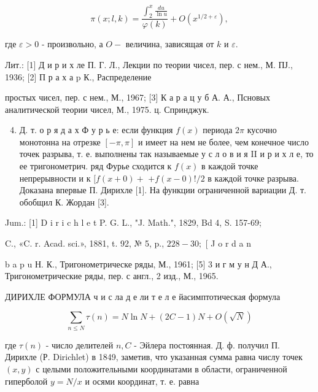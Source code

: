 \documentclass[10pt]{article}
\begin{document}
\[

\pi(x ; l, k)=\frac{\int_{2}^{x} \frac{d u}{\ln u}}{\varphi(k)}+O\left(x^{1 / 2+\varepsilon}\right),

\]



где $\varepsilon>0$ - произвольно, а $O-$ величина, зависящая от $k$ и $\varepsilon$.



Лит.: [1] Д и р и х ле П. Г. Л., Лекции по теории чисел, пер. с нем., М. ПЈ., 1936; [2] П р а х а p К., Распределение

простых чисел, пер. с нем., М., 1967; [3] К а р а ц у б А. А., Псновых аналитической теории чисел, М., 1975. ц. Спринджук.



\begin{enumerate}

  \setcounter{enumi}{3}

  \item Д. т. о р я д а х Ф у р ь е: если функция $f(x)$ периода $2 \pi$ кусочно монотонна на отрезке $[-\pi, \pi]$ и имеет на нем не более, чем конечное число точек разрыва, т. е. выполнены так называемые у с л о в и я II и р и х л е, то ее тригонометрич. ряд Фурье сходится к $f(x)$ в каждой точке непрерывности и к $[f(x+0)+$ $+f(x-0) ! / 2$ в каждой точке разрыва. Доказана впервые П. Дирихле [1]. На функции ограниченной вариации Д. т. обобщил К. Жордан [3].

\end{enumerate}



Jum.: [1] D i r i c h l e t P. G. L., "J. Math.", 1829, Bd 4, S. 157-69;

C., «C. r. Acad. sci.», 1881, t. 92, № 5, p., $228-30 ;$ [ J o r d a n

b a p u Н. К., Тригонометрическе ряды, М., 1961; [5] 3 и г м у н Д А., Тригонометрические ряды, пер. с англ., 2 изд., М., 1965.



ДИРИХЛЕ ФОРМУЛА ч и с ла д е ли т е л е йасимптотическая формула



\[

\sum_{n \leqslant N} \tau(n)=N \ln N+(2 C-1) N+O(\sqrt{N})

\]



где $\tau(n)$ - число делителей $n, C$ - Эйлера постоянная. Д. ф. получил П. Дирихле (Р. Dirichlet) в 1849, заметив, что указанная сумма равна числу точек $(x, y)$ с целыми положительными координатами в области, ограниченной гиперболой $y=N / x$ и осями координат, т. е. равна
\end{document}

